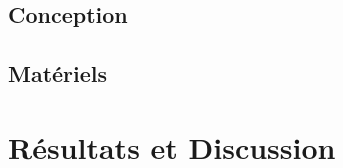 \documentclass{ifri}
\begin{document}
   \section{Conception}
     
   \section{Matériels}
     

\chapter{Résultats et Discussion}\label{chap:3}
   



\lhead[]{} \rhead[]{} \chead[]{}

%
%





\end{document}
